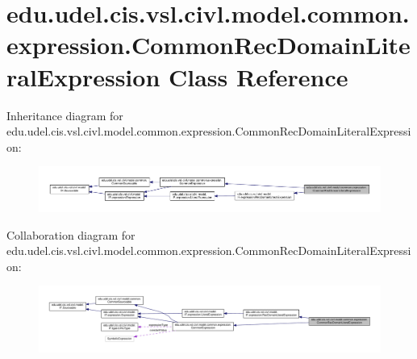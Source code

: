 \hypertarget{classedu_1_1udel_1_1cis_1_1vsl_1_1civl_1_1model_1_1common_1_1expression_1_1CommonRecDomainLiteralExpression}{}\section{edu.\+udel.\+cis.\+vsl.\+civl.\+model.\+common.\+expression.\+Common\+Rec\+Domain\+Literal\+Expression Class Reference}
\label{classedu_1_1udel_1_1cis_1_1vsl_1_1civl_1_1model_1_1common_1_1expression_1_1CommonRecDomainLiteralExpression}


Inheritance diagram for edu.\+udel.\+cis.\+vsl.\+civl.\+model.\+common.\+expression.\+Common\+Rec\+Domain\+Literal\+Expression\+:
\nopagebreak
\begin{figure}[H]
\begin{center}
\leavevmode
\includegraphics[width=350pt]{classedu_1_1udel_1_1cis_1_1vsl_1_1civl_1_1model_1_1common_1_1expression_1_1CommonRecDomainLiteralExpression__inherit__graph}
\end{center}
\end{figure}


Collaboration diagram for edu.\+udel.\+cis.\+vsl.\+civl.\+model.\+common.\+expression.\+Common\+Rec\+Domain\+Literal\+Expression\+:
\nopagebreak
\begin{figure}[H]
\begin{center}
\leavevmode
\includegraphics[width=350pt]{classedu_1_1udel_1_1cis_1_1vsl_1_1civl_1_1model_1_1common_1_1expression_1_1CommonRecDomainLiteralExpression__coll__graph}
\end{center}
\end{figure}
